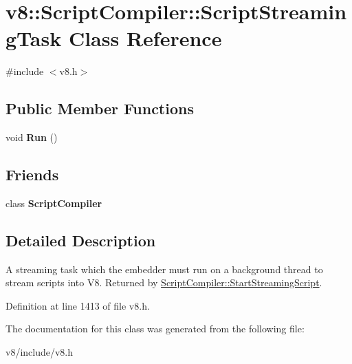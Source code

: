 \hypertarget{classv8_1_1ScriptCompiler_1_1ScriptStreamingTask}{}\section{v8\+:\+:Script\+Compiler\+:\+:Script\+Streaming\+Task Class Reference}
\label{classv8_1_1ScriptCompiler_1_1ScriptStreamingTask}


{\ttfamily \#include $<$v8.\+h$>$}

\subsection*{Public Member Functions}
\begin{DoxyCompactItemize}
\item 
\mbox{\label{classv8_1_1ScriptCompiler_1_1ScriptStreamingTask_ac4900e34a2045112d3ed10db8228165b}} 
void {\bfseries Run} ()
\end{DoxyCompactItemize}
\subsection*{Friends}
\begin{DoxyCompactItemize}
\item 
\mbox{\label{classv8_1_1ScriptCompiler_1_1ScriptStreamingTask_a1cb50af99960b4c11eaee7347e034f51}} 
class {\bfseries Script\+Compiler}
\end{DoxyCompactItemize}


\subsection{Detailed Description}
A streaming task which the embedder must run on a background thread to stream scripts into V8. Returned by \mbox{\hyperlink{classv8_1_1ScriptCompiler_a406bb44ef02d644d94bccd3f7b04f2d4}{Script\+Compiler\+::\+Start\+Streaming\+Script}}. 

Definition at line 1413 of file v8.\+h.



The documentation for this class was generated from the following file\+:\begin{DoxyCompactItemize}
\item 
v8/include/v8.\+h\end{DoxyCompactItemize}
